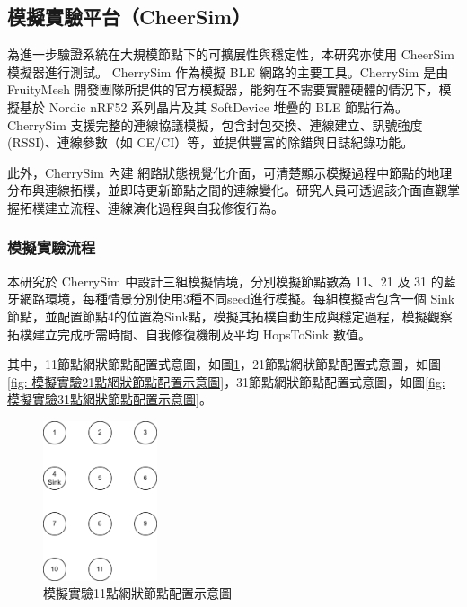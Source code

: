 \begin{ZhChapter}
\begin{itemize}
\end{itemize}

\subsection{模擬實驗平台（CheerSim）}
為進一步驗證系統在大規模節點下的可擴展性與穩定性，本研究亦使用 CheerSim 模擬器進行測試。 CherrySim 作為模擬 BLE 網路的主要工具。CherrySim 是由 FruityMesh 開發團隊所提供的官方模擬器，能夠在不需要實體硬體的情況下，模擬基於 Nordic nRF52 系列晶片及其 SoftDevice 堆疊的 BLE 節點行為。CherrySim 支援完整的連線協議模擬，包含封包交換、連線建立、訊號強度 (RSSI)、連線參數（如 CE/CI）等，並提供豐富的除錯與日誌紀錄功能。

此外，CherrySim 內建 網路狀態視覺化介面，可清楚顯示模擬過程中節點的地理分布與連線拓樸，並即時更新節點之間的連線變化。研究人員可透過該介面直觀掌握拓樸建立流程、連線演化過程與自我修復行為。

\subsubsection{模擬實驗流程}
本研究於 CherrySim 中設計三組模擬情境，分別模擬節點數為 11、21 及 31 的藍牙網路環境，每種情景分別使用3種不同seed進行模擬。每組模擬皆包含一個 Sink 節點，並配置節點4的位置為Sink點，模擬其拓樸自動生成與穩定過程，模擬觀察拓樸建立完成所需時間、自我修復機制及平均 HopsToSink 數值。

其中，11節點網狀節點配置式意圖，如圖\ref{fig: 模擬實驗11點網狀節點配置示意圖}，21節點網狀節點配置式意圖，如圖\ref{fig: 模擬實驗21點網狀節點配置示意圖}，31節點網狀節點配置式意圖，如圖\ref{fig: 模擬實驗31點網狀節點配置示意圖}。

\begin{figure}[H]
    \centering
    \includegraphics[width = 0.3\textwidth]{image/模擬實驗11點網狀節點配置示意圖.png}
    \caption{模擬實驗11點網狀節點配置示意圖}
    \label{fig: 模擬實驗11點網狀節點配置示意圖}
\end{figure}


\end{ZhChapter}
